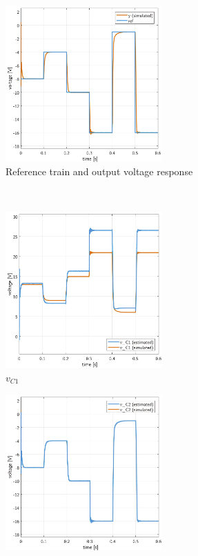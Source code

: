 \begin{figure}[H]
    \begin{framed}
    \captionsetup[subfigure]{justification = centering}
    \centering
    \begin{subfigure}[b]{0.8\textwidth}
    \centering\includegraphics[height = 6cm]{figures/estimation/ref_y_pulsetrain.pdf}
    \caption{Reference train and output voltage response}
    \label{fig:estimatingconditions1}
    \end{subfigure}
    \\[11pt]
    \begin{subfigure}[b]{0.45\textwidth}
    \centering
    \includegraphics[height = 6cm]{figures/estimation/vC1_vC1.pdf}
    \caption{$v_{C1}$}
    \label{fig:estimatingfirst}
    \end{subfigure}
    \hfill
    \begin{subfigure}[b]{0.45\textwidth}
    \centering
    \includegraphics[height = 6cm]{figures/estimation/vC2_vC2.pdf}

\end{subfigure}
\end{framed}
\end{figure}
